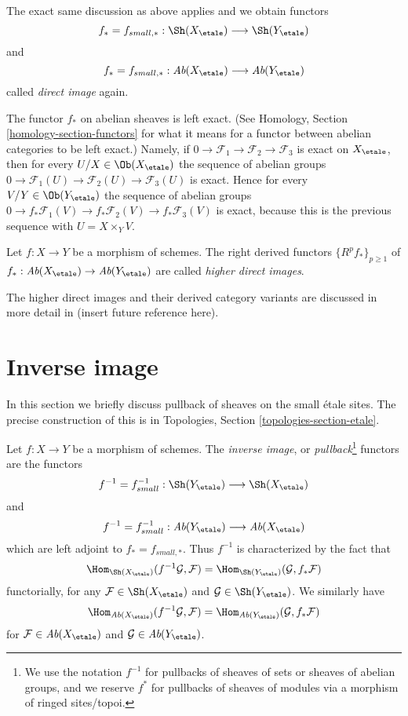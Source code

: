 \noindent
The exact same discussion as above applies and we obtain functors
$$
f_* = f_{small, *} :
\Sh(X_\etale)
\longrightarrow
\Sh(Y_\etale)
$$
and
$$
f_* = f_{small, *} :
\textit{Ab}(X_\etale)
\longrightarrow
\textit{Ab}(Y_\etale)
$$
called {\it direct image} again.

\medskip\noindent
The functor $f_*$ on abelian sheaves is left exact. (See
Homology, Section \ref{homology-section-functors}
for what it means for a functor between abelian categories to be left exact.)
Namely, if
$0 \to \mathcal{F}_1 \to \mathcal{F}_2 \to \mathcal{F}_3$
is exact on $X_\etale$, then for every
$U/X \in \Ob(X_\etale)$
the sequence of abelian groups
$0 \to \mathcal{F}_1(U) \to \mathcal{F}_2(U) \to \mathcal{F}_3(U)$
is exact. Hence for every $V/Y \in \Ob(Y_\etale)$
the sequence of abelian groups
$0 \to f_*\mathcal{F}_1(V) \to f_*\mathcal{F}_2(V) \to f_*\mathcal{F}_3(V)$
is exact, because this is the previous sequence with $U = X \times_Y V$.

\begin{definition}
\label{definition-higher-direct-images}
Let $f: X \to Y$ be a morphism of schemes.
The right derived functors $\{R^pf_*\}_{p \geq 1}$ of
$f_* : \textit{Ab}(X_\etale) \to \textit{Ab}(Y_\etale)$
are called {\it higher direct images}.
\end{definition}

\noindent
The higher direct images and their derived category variants are
discussed in more detail in (insert future reference here).



\section{Inverse image}
\label{section-inverse-image}

\noindent
In this section we briefly discuss pullback of sheaves on the small
\'etale sites. The precise construction of this is in
Topologies, Section \ref{topologies-section-etale}.

\begin{definition}
\label{definition-inverse-image}
Let $f: X\to Y$ be a morphism of schemes. The {\it inverse image}, or
{\it pullback}\footnote{We use the notation $f^{-1}$ for pullbacks of
sheaves of sets or sheaves of abelian groups, and we reserve $f^*$ for
pullbacks of sheaves of modules via a morphism of ringed sites/topoi.}
functors are the functors
$$
f^{-1} = f_{small}^{-1} :
\Sh(Y_\etale)
\longrightarrow
\Sh(X_\etale)
$$
and
$$
f^{-1} = f_{small}^{-1} :
\textit{Ab}(Y_\etale)
\longrightarrow
\textit{Ab}(X_\etale)
$$
which are left adjoint to $f_* = f_{small, *}$. Thus
$f^{-1}$ is characterized by the fact that
$$
\Hom_{{\Sh(X_\etale)}} (f^{-1}\mathcal{G}, \mathcal{F})
=
\Hom_{\Sh(Y_\etale)} (\mathcal{G}, f_*\mathcal{F})
$$
functorially, for any $\mathcal{F} \in \Sh(X_\etale)$ and
$\mathcal{G} \in \Sh(Y_\etale)$. We similarly have
$$
\Hom_{{\textit{Ab}(X_\etale)}} (f^{-1}\mathcal{G}, \mathcal{F})
=
\Hom_{\textit{Ab}(Y_\etale)} (\mathcal{G}, f_*\mathcal{F})
$$
for $\mathcal{F} \in \textit{Ab}(X_\etale)$ and
$\mathcal{G} \in \textit{Ab}(Y_\etale)$.
\end{definition}

